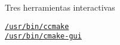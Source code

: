 \begin{frame}[fragile]
	Tres herramientas interactivas

	\begin{description}
		\item[\href{https://man.archlinux.org/man/ccmake.1}{\lstinline{/usr/bin/ccmake}}]

		\item[\href{https://man.archlinux.org/man/cmake-gui.1}{\lstinline{/usr/bin/cmake-gui}}]
	\end{description}

\end{frame}








